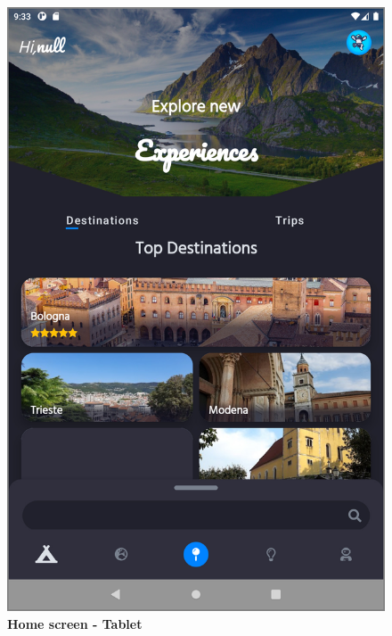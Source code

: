\begin{figure}[!htb]
\centering
\begin{minipage}{.45\textwidth}
\centering
\includegraphics[width=.95\textwidth]{../Images/UI/HomeBig.jpg}
\caption{\label{fig:dbapiuser}\textbf{Home screen - Tablet}}
\end{minipage} 
\begin{minipage}{.45\textwidth}
\centering

\end{minipage}
\end{figure}
